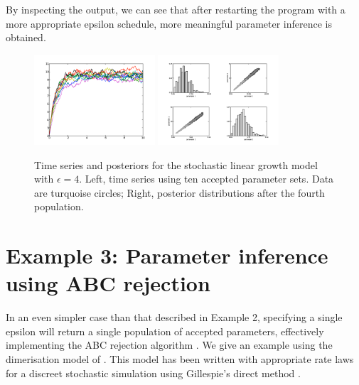 \documentclass[a4paper]{report}
\begin{document}
By inspecting the output, we can see that after restarting the program with a more appropriate epsilon schedule, more meaningful parameter inference is obtained. 
\begin{figure}[htbp]
\centering
\includegraphics[width=0.4\textwidth]{Graphics/TimeSeriesLinGrow2.png}
\includegraphics[width=0.4\textwidth]{Graphics/ScatterPlotsLinGrow2.png}
\caption{Time series and posteriors for the stochastic linear growth model with $\epsilon = 4$. Left, time series using ten accepted parameter sets. Data are turquoise circles; Right, posterior distributions after the fourth population. \label{LinGrow2}}
\end{figure}

\section{Example 3: Parameter inference using ABC rejection}
In an even simpler case than that described in Example 2, specifying a single epsilon will return a single population of accepted parameters, effectively implementing the ABC rejection algorithm \citep{ABCrejection}. We give an example using the dimerisation model of \cite{Wilkinson2006}. This model has been written with appropriate rate laws for a discreet stochastic simulation using Gillespie's direct method \citep{Gillespie1977}. 
\end{document}
